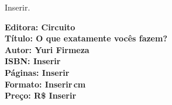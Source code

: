 \noindent{}Inserir.

\vfill
\noindent\begin{minipage}[c]{1\linewidth}
{\small\textbf{
\hspace*{-.1cm}Editora: Circuito\\
Título: O que exatamente vocês fazem?\\
Autor: Yuri Firmeza\\ 
ISBN: Inserir\\
Páginas: Inserir\\
Formato: Inserir\,cm\\
Preço: R\$ Inserir\\
}}
\end{minipage}
\pagebreak

\vspace*{1.5cm}
\bigskip

\hfill{}
\bigskip
\bigskip
\bigskip

